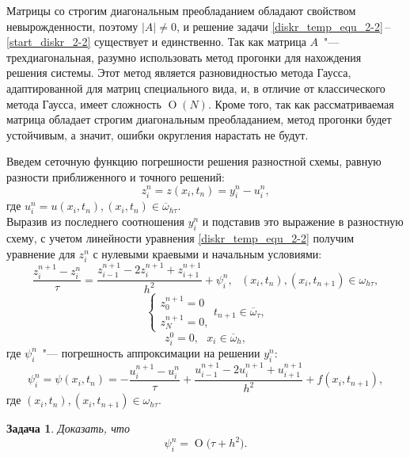 \documentclass[11pt,a4paper,twoside]{report}
\numberwithin{equation}{section}
\newtheorem*{problem}{Задача}
\theoremstyle{definition}
\theoremstyle{plain}
\newcommand{\bigO}[1]{\ensuremath{\operatorname{O}\bigl(#1\bigr)}}
\begin{document}
Матрицы со строгим диагональным преобладанием обладают свойством
невырожденности, поэтому $|A|\neq0$, и решение задачи
\eqref{diskr_temp_equ_2-2}\,--\,\eqref{start_diskr_2-2} существует и единственно.
Так как матрица $A$~"--- трехдиагональная, разумно использовать метод прогонки
для нахождения решения системы. Этот метод является разновидностью метода Гаусса,
адаптированной для матриц специального вида, и, в отличие от классического метода
Гаусса, имеет сложность $\operatorname{O}(N)$. Кроме того, так как рассматриваемая матрица
обладает строгим диагональным преобладанием, метод прогонки будет устойчивым, а значит,
ошибки округления нарастать не будут.

Введем сеточную функцию погрешности решения разностной схемы,
равную разности приближенного и точного решений:
%
$$
    z_i^n = z(x_i, t_n) = y_i^n - u_i^n,
$$
%
где $u_i^n = u(x_i, t_n), (x_i, t_n) \in \overline{\omega}_{h \tau}$.\\
Выразив из последнего соотношения $y_i^n$ и подставив это выражение в разностную
схему, с учетом линейности уравнения
\eqref{diskr_temp_equ_2-2} получим уравнение для $z_i^n$ с нулевыми краевыми и начальным
условиями:
%
\begin{equation}
    \label{z_eq_3}
    \dfrac{z_i^{n+1} - z_i^n}{\tau} = \dfrac{z_{i-1}^{n+1} - 2z_i^{n+1} +
    z_{i+1}^{n+1}}{h^2} + \psi_i^n,~~~(x_i, t_n), (x_i, t_{n+1})\in \omega_{h \tau},
\end{equation}
%
\begin{equation}
    \label{z_board_3}
    \begin{cases}
        z_0^{n+1} = 0 \\
        z_N^{n+1} = 0,
    \end{cases}
    t_{n+1}\in \overline{\omega}_{\tau},
\end{equation}
%
\begin{equation}
    \label{z_start_3}
    z_i^0 = 0,~~~x_i\in \overline{\omega}_h,
\end{equation}
%
где $\psi_i^n$~"--- погрешность аппроксимации на решении $y_i^n$:
%
\begin{equation}
%
    \label{approx_temp_1}
    \psi_i^n = \psi(x_i, t_n) =  -\dfrac{u_i^{n+1} - u_i^n}{\tau}
    + \dfrac{u_{i-1}^{n+1} - 2u_i^{n+1} + u_{i+1}^{n+1}}{h^2} + f(x_i, t_{n+1}),
%
\end{equation}
%
где $(x_i, t_n), (x_i, t_{n+1})\in \omega_{h \tau}$.
%
\begin{problem}
%
    Доказать, что
    \begin{equation}
        \label{eq:problemeq}
        \psi_i^n = \bigO{\tau + h^2}.
    \end{equation}
%
\end{problem}
\end{document}
